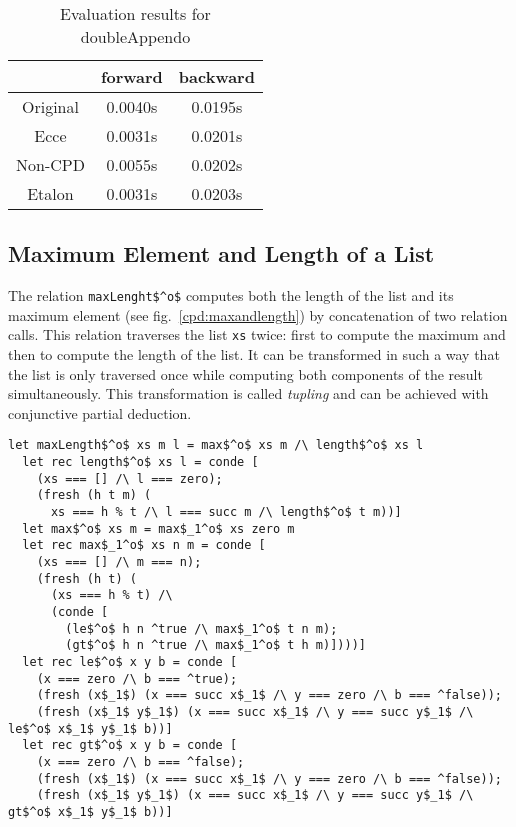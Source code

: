 \begin{table}
  \centering
  \begin{tabular}{c||c||c}
                   & forward & backward \\
  \hline\hline
  Original         & 0.0040s & 0.0195s \\ \hline
  Ecce             & 0.0031s & 0.0201s \\ \hline
  Non-CPD          & 0.0055s & 0.0202s \\ \hline
  Etalon           & 0.0031s & 0.0203s \\
  \end{tabular}
  \caption{Evaluation results for doubleAppendo}
  \label{tbl:doubleApp}
\end{table}

\subsection{Maximum Element and Length of a List}

The relation \lstinline{maxLenght$^o$} computes both the length of the list and its maximum element (see fig.~\ref{cpd:maxandlength}) by concatenation of two relation calls.
This relation traverses the list \lstinline{xs} twice: first to compute the maximum and then to compute the length of the list.
It can be transformed in such a way that the list is only traversed once while computing both components of the result simultaneously.
This transformation is called \emph{tupling} and can be achieved with conjunctive partial deduction.

\begin{figure*}[!h]
  \centering
  \begin{minipage}{0.85\textwidth}
\begin{lstlisting}[label={cpd:maxandlength}, caption={Maximum element and length of the list}, captionpos=b, frame=tb]
  let maxLength$^o$ xs m l = max$^o$ xs m /\ length$^o$ xs l
  let rec length$^o$ xs l = conde [
    (xs === [] /\ l === zero);
    (fresh (h t m) (
      xs === h % t /\ l === succ m /\ length$^o$ t m))]
  let max$^o$ xs m = max$_1^o$ xs zero m
  let rec max$_1^o$ xs n m = conde [
    (xs === [] /\ m === n);
    (fresh (h t) (
      (xs === h % t) /\
      (conde [
        (le$^o$ h n ^true /\ max$_1^o$ t n m);
        (gt$^o$ h n ^true /\ max$_1^o$ t h m)])))]
  let rec le$^o$ x y b = conde [
    (x === zero /\ b === ^true);
    (fresh (x$_1$) (x === succ x$_1$ /\ y === zero /\ b === ^false));
    (fresh (x$_1$ y$_1$) (x === succ x$_1$ /\ y === succ y$_1$ /\ le$^o$ x$_1$ y$_1$ b))]
  let rec gt$^o$ x y b = conde [
    (x === zero /\ b === ^false);
    (fresh (x$_1$) (x === succ x$_1$ /\ y === zero /\ b === ^false));
    (fresh (x$_1$ y$_1$) (x === succ x$_1$ /\ y === succ y$_1$ /\ gt$^o$ x$_1$ y$_1$ b))]
  \end{lstlisting}
\end{minipage}
\end{figure*}

